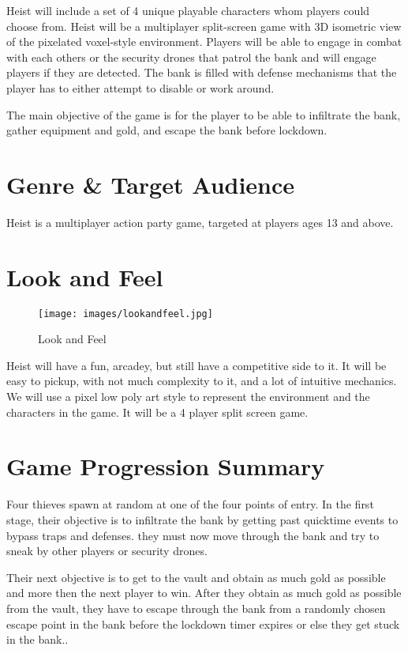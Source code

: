 \documentclass[10pt]{report}
\begin{document}
Heist will include a set of 4 unique playable characters whom players could choose from. Heist will be a multiplayer split-screen game with 3D isometric view of the pixelated voxel-style environment. Players will be able to engage in combat with each others or the security drones that patrol the bank and will engage players if they are detected. The bank is filled with defense mechanisms that the player has to either attempt to disable or work around.

The main objective of the game is for the player to be able to infiltrate the bank, gather equipment and gold, and escape the bank before lockdown.

\section{Genre \& Target Audience}

Heist is a multiplayer action party game, targeted at players ages 13 and above.

\section{Look and Feel}

\begin{figure}[H]
    \texttt{[image: images/lookandfeel.jpg]}
    \caption{Look and Feel}
\end{figure}

Heist will have a fun, arcadey, but still have a competitive side to it. It will be easy to pickup, with not much complexity to it, and a lot of intuitive mechanics. We will use a pixel low poly art style to represent the environment and the characters in the game. It will be a 4 player split screen game.

\section{Game Progression Summary}

Four thieves spawn at random at one of the four points of entry. In the first stage, their objective is to infiltrate the bank by getting past quicktime events to bypass traps and defenses. they must now move through the bank and try to sneak by other players or security drones. 

Their next objective is to get to the vault and obtain as much gold as possible and more then the next player to win. After they obtain as much gold as possible from the vault, they have to escape through the bank from a randomly chosen escape point in the bank before the lockdown timer expires or else they get stuck in the bank..
\end{document}
